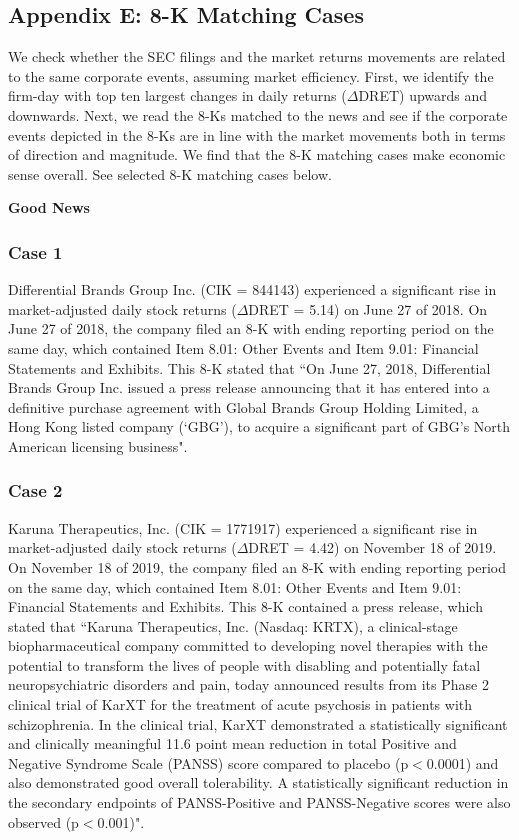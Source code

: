 \newpage
\begin{small}
\subsection*{Appendix E: 8-K Matching Cases}
We check whether the SEC filings and the market returns movements are related to the same corporate events, assuming market efficiency. First, we identify the firm-day with top ten largest changes in daily returns ($\Delta$DRET) upwards and downwards. Next, we read the 8-Ks matched to the news and see if the corporate events depicted in the 8-Ks are in line with the market movements both in terms of direction and magnitude. We find that the 8-K matching cases make economic sense overall. See selected 8-K matching cases below.
\label{appe}
\begin{center}
	\textbf{Good News}
\end{center}
\subsubsection*{Case 1}
Differential Brands Group Inc. (CIK = 844143) experienced a significant rise in market-adjusted daily stock returns ($\Delta$DRET = 5.14) on June 27 of 2018. On June 27 of 2018, the company filed an 8-K with ending reporting period on the same day, which contained Item 8.01: Other Events and Item 9.01: Financial Statements and Exhibits. This 8-K stated that ``On June 27, 2018, Differential Brands Group Inc. issued a press release announcing that it has entered into a definitive purchase agreement with Global Brands Group Holding Limited, a Hong Kong listed company (`GBG'), to acquire a significant part of GBG’s North American licensing business".
\subsubsection*{Case 2}
Karuna Therapeutics, Inc. (CIK = 1771917) experienced a significant rise in market-adjusted daily stock returns ($\Delta$DRET = 4.42) on November 18 of 2019. On November 18 of 2019, the company filed an 8-K with ending reporting period on the same day, which contained Item 8.01: Other Events and Item 9.01: Financial Statements and Exhibits. This 8-K contained a press release, which stated that ``Karuna Therapeutics, Inc. (Nasdaq: KRTX), a clinical-stage biopharmaceutical company committed to developing novel therapies with the potential to transform the lives of people with disabling and potentially fatal neuropsychiatric disorders and pain, today announced results from its Phase 2 clinical trial of KarXT for the treatment of acute psychosis in patients with schizophrenia. In the clinical trial, KarXT demonstrated a statistically significant and clinically meaningful 11.6 point mean reduction in total Positive and Negative Syndrome Scale (PANSS) score compared to placebo (p$<$0.0001) and also demonstrated good overall tolerability. A statistically significant reduction in the secondary endpoints of PANSS-Positive and PANSS-Negative scores were also observed (p$<$0.001)". 

\end{small}
